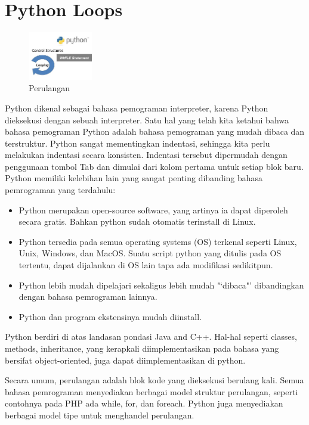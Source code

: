 \section{Python Loops}
\begin{figure}[ht]
	\centerline{\includegraphics[width=0.25\textwidth]{gambar/perulangan}}
	\caption{Perulangan}
	\label{perulangan}
\end{figure}
Python dikenal sebagai bahasa pemograman interpreter, karena Python dieksekusi dengan sebuah interpreter. Satu hal yang telah kita ketahui bahwa bahasa pemograman Python adalah bahasa pemograman yang mudah dibaca dan terstruktur. Python sangat mementingkan indentasi, sehingga kita perlu melakukan indentasi secara konsisten. Indentasi tersebut dipermudah dengan penggunaan tombol Tab dan dimulai dari kolom pertama untuk setiap blok baru\cite{santoso2009bahasa}.
Python memiliki kelebihan lain yang sangat penting dibanding bahasa pemrograman yang terdahulu:
\begin{itemize}
\item Python merupakan open-source software, yang artinya ia dapat diperoleh secara gratis. Bahkan python sudah otomatis terinstall di Linux.
\item Python tersedia pada semua operating systems (OS) terkenal seperti Linux, Unix, Windows, dan MacOS. Suatu script python yang ditulis pada OS tertentu, dapat dijalankan di OS lain tapa ada modifikasi sedikitpun.
\item Python lebih mudah dipelajari sekaligus lebih mudah "‘dibaca"’ dibandingkan dengan bahasa pemrograman lainnya.
\item Python dan program ekstensinya mudah diinstall.
\end{itemize}
Python berdiri di atas landasan pondasi Java and C++. Hal-hal seperti classes, methods, inheritance, yang kerapkali diimplementasikan pada bahasa yang bersifat object-oriented, juga dapat diimplementasikan di python.\cite{suparno2013komputasi}

Secara umum, perulangan adalah blok kode yang dieksekusi berulang kali. Semua bahasa pemrograman menyediakan berbagai model struktur perulangan, seperti contohnya pada PHP ada while, for, dan foreach. Python juga menyediakan berbagai model tipe untuk menghandel perulangan. \par

